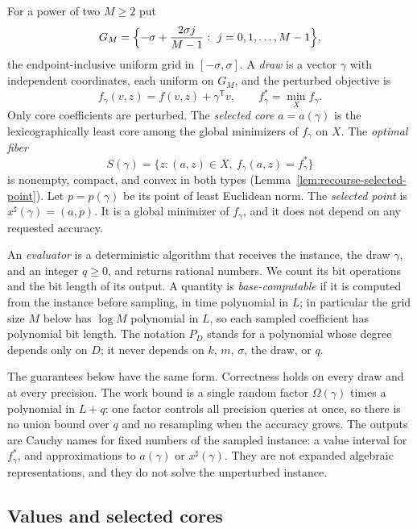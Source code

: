 For a power of two $M\ge2$ put
\[
 G_M=\Bigl\{-\sigma+\frac{2\sigma j}{M-1}:\ j=0,1,\ldots,M-1\Bigr\},
\]
the endpoint-inclusive uniform grid in $[-\sigma,\sigma]$. A
\emph{draw} is a vector $\gamma$ with independent coordinates, each
uniform on $G_M$, and the perturbed objective is
\[
 f_\gamma(v,z)=f(v,z)+\gamma^{\mathsf T}v,\qquad
 f_\gamma^*=\min_Xf_\gamma .
\]
Only core coefficients are perturbed. The \emph{selected core}
$a=a(\gamma)$ is the lexicographically least core among the global
minimizers of $f_\gamma$ on $X$. The \emph{optimal fiber}
\[
 S(\gamma)=\{z:(a,z)\in X,\ f_\gamma(a,z)=f_\gamma^*\}
\]
is nonempty, compact, and convex in both types
(Lemma~\ref{lem:recourse-selected-point}). Let $p=p(\gamma)$ be its
point of least Euclidean norm. The \emph{selected point} is
$x^\sharp(\gamma)=(a,p)$. It is a global minimizer of $f_\gamma$, and
it does not depend on any requested accuracy.

An \emph{evaluator} is a deterministic algorithm that receives the
instance, the draw $\gamma$, and an integer $q\ge0$, and returns
rational numbers. We count its bit operations and the bit length of its
output. A quantity is \emph{base-computable} if it is computed from the
instance before sampling, in time polynomial in $L$; in particular the
grid size $M$ below has $\log M$ polynomial in $L$, so each sampled
coefficient has polynomial bit length. The notation $P_D$ stands for a
polynomial whose degree depends only on $D$; it never depends on $k$,
$m$, $\sigma$, the draw, or $q$.

The guarantees below have the same form. Correctness holds on every
draw and at every precision. The work bound is a single random factor
$\Omega(\gamma)$ times a polynomial in $L+q$: one factor controls all
precision queries at once, so there is no union bound over $q$ and no
resampling when the accuracy grows. The outputs are Cauchy names for
fixed numbers of the sampled instance: a value interval for
$f_\gamma^*$, and approximations to $a(\gamma)$ or $x^\sharp(\gamma)$.
They are not expanded algebraic representations, and they do not solve
the unperturbed instance.

\subsection{Values and selected cores}
\label{sec:recourse-core}

